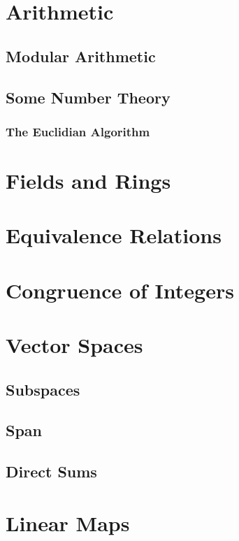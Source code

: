 \documentclass[10pt]{book}
\begin{document}
\chapter{Arithmetic}
\section{Modular Arithmetic}
\section{Some Number Theory}
\subsection{The Euclidian Algorithm}

\chapter{Fields and Rings}

\chapter{Equivalence Relations}

\chapter{Congruence of Integers}

\chapter{Vector Spaces}
\section{Subspaces}
\section{Span}
\section{Direct Sums}

\chapter{Linear Maps}
\end{document}
